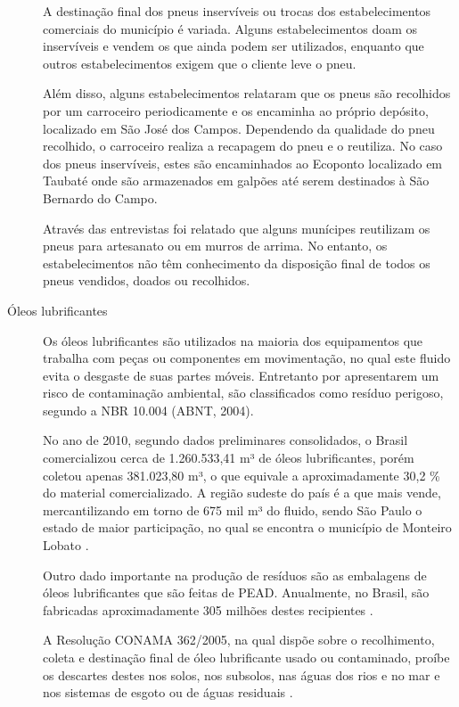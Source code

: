 \begin{description}
	A destinação final dos pneus inservíveis ou trocas dos estabelecimentos comerciais do município é variada. Alguns estabelecimentos doam os inservíveis e vendem os que ainda podem ser utilizados, enquanto que outros estabelecimentos exigem que o cliente leve o pneu. 
	
	Além disso, alguns estabelecimentos relataram que os pneus são 
	recolhidos por um carroceiro periodicamente e os encaminha ao próprio depósito, localizado em São José dos Campos. Dependendo da qualidade do pneu recolhido, o carroceiro realiza a recapagem do pneu e o reutiliza. No caso dos pneus inservíveis, estes são encaminhados ao Ecoponto localizado em Taubaté onde são armazenados em galpões até serem destinados à São Bernardo do Campo.
	
	Através das entrevistas foi relatado que alguns munícipes reutilizam os pneus para artesanato ou em murros de arrima. No entanto, os estabelecimentos não têm conhecimento da disposição final de todos os pneus vendidos, doados ou recolhidos.
	
	
	\item[Óleos lubrificantes]	Os óleos lubrificantes são utilizados na maioria dos equipamentos que trabalha com peças ou componentes em movimentação, no qual este fluido evita o desgaste de suas partes móveis. Entretanto por apresentarem um risco de contaminação ambiental, são classificados como resíduo perigoso, segundo a NBR 10.004 (ABNT, 2004). 
	
	No ano de 2010, segundo dados preliminares consolidados, o Brasil comercializou cerca de 1.260.533,41 m³ de óleos lubrificantes, porém coletou apenas 381.023,80 m³, o que equivale a aproximadamente 30,2 \% do material comercializado. A região sudeste do país é a que mais vende, mercantilizando em torno de 675 mil m³ do fluido, sendo São Paulo o estado de maior participação, no qual se encontra o município de Monteiro Lobato \cite{IPEA2012d}. 
	
	Outro dado importante na produção de resíduos são as embalagens de óleos lubrificantes que são feitas de PEAD. Anualmente, no Brasil, são fabricadas aproximadamente 305 milhões destes recipientes \cite{IPEA2012d}.
	
	A Resolução CONAMA 362/2005, na qual dispõe sobre o recolhimento, coleta e destinação final de óleo lubrificante usado ou contaminado, proíbe os descartes destes nos solos, nos subsolos, nas águas dos rios e no mar e nos sistemas de esgoto ou de águas residuais \cite{conama:362}.
	

\end{description}
